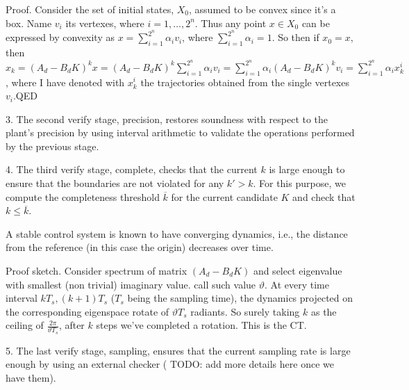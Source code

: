 \documentclass[runningheads,a4paper]{llncs}
\newcommand{\addtodo}[1]{{\color{red} TODO: #1}}
\begin{document}

Proof. 
Consider the set of initial states, $X_0$, assumed to be convex since it's a box. 
Name $v_i$ its vertexes, where $i=1,\ldots, 2^n$.  
Thus any point $x \in X_0$ can be expressed by convexity as $x = \sum_{i=1}^{2^n} \alpha_i v_i$, 
where $\sum_{i=1}^{2^n} \alpha_i =1$. 
So then if $x_0=x$, then $x_k = (A_d - B_d K)^k x = 
(A_d - B_d K)^k \sum_{i=1}^{2^n} \alpha_i v_i = 
\sum_{i=1}^{2^n} \alpha_i (A_d - B_d K)^k v_i  = 
\sum_{i=1}^{2^n} \alpha_i x_k^i$, 
where I have denoted with $x_k^i$ the trajectories obtained from the single vertexes $v_i$.QED


3. The second {\sc verify} stage, {\sc precision}, 
 restores soundness with respect to the plant's precision
by using interval arithmetic \cite{moore1966interval} to validate the 
operations performed by the previous stage. 

4. The third {\sc verify} stage, {\sc complete}, checks that the
current $k$ is large enough to ensure that the boundaries are not
violated for any $k'{>}k$.  For this purpose, we compute the
completeness threshold $\overline{k}$ for the current candidate $K$
and check that $k{\leq}\overline{k}$. 

A stable control system is known to have converging dynamics, i.e., the
distance from the reference (in this case the origin) decreases over time. 


Proof sketch. 
Consider spectrum of matrix $(A_d - B_d K)$ and select eigenvalue with smallest (non trivial) imaginary value.  
call such value $\vartheta$. 
At every time interval $kT_s, (k+1)T_s$ ($T_s$ being the sampling time), 
the dynamics projected on the corresponding eigenspace rotate of $\vartheta T_s$ radiants.  
So surely taking $k$ as the ceiling of $\frac{2\pi}{\vartheta T_s}$, after $k$ steps we've completed a rotation. 
This is the CT. 

5. The last {\sc verify} stage, {\sc sampling}, 
ensures that the current sampling rate is large enough by using an 
external checker (\addtodo{add more details here once we have them}).




\end{document}
